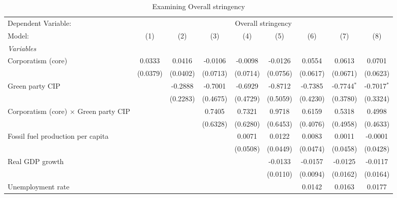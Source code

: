 
\begin{table}[htbp]
   \caption{Examining Overall stringency}
   \centering
   \begin{tabular}{lcccccccc}
      \tabularnewline \midrule \midrule
      Dependent Variable: & \multicolumn{8}{c}{Overall stringency}\\
      Model:                                       & (1)      & (2)      & (3)      & (4)      & (5)      & (6)      & (7)           & (8)\\  
      \midrule
      \emph{Variables}\\
      Corporatism (core)                           & 0.0333   & 0.0416   & -0.0106  & -0.0098  & -0.0126  & 0.0554   & 0.0613        & 0.0701\\   
                                                   & (0.0379) & (0.0402) & (0.0713) & (0.0714) & (0.0756) & (0.0617) & (0.0671)      & (0.0623)\\   
      Green party CIP                              &          & -0.2888  & -0.7001  & -0.6929  & -0.8712  & -0.7385  & -0.7744$^{*}$ & -0.7017$^{*}$\\   
                                                   &          & (0.2283) & (0.4675) & (0.4729) & (0.5059) & (0.4230) & (0.3780)      & (0.3324)\\   
      Corporatism (core) $\times$ Green party CIP  &          &          & 0.7405   & 0.7321   & 0.9718   & 0.6159   & 0.5318        & 0.4998\\   
                                                   &          &          & (0.6328) & (0.6280) & (0.6453) & (0.4076) & (0.4958)      & (0.4633)\\   
      Fossil fuel production per capita            &          &          &          & 0.0071   & 0.0122   & 0.0083   & 0.0011        & -0.0001\\   
                                                   &          &          &          & (0.0508) & (0.0449) & (0.0474) & (0.0458)      & (0.0428)\\   
      Real GDP growth                              &          &          &          &          & -0.0133  & -0.0157  & -0.0125       & -0.0117\\   
                                                   &          &          &          &          & (0.0110) & (0.0094) & (0.0162)      & (0.0164)\\   
      Unemployment rate                            &          &          &          &          &          & 0.0142   & 0.0163        & 0.0177\\   

\end{tabular}
\end{table}
